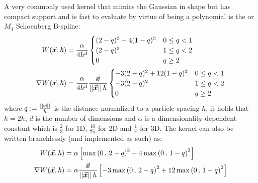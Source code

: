 A very commonly used kernel that mimics the Gaussian in shape but has compact support and
is fast to evaluate by virtue of being a polynomial is the  or $M_4$ Schoenberg B-spline\autocite*{price-2012}\autocite*{teschner-lecture}:
\begin{align}
  \label{eq:kernel-function}
  W(\vec{\bm{x}}, \hbar)        & = \frac{\alpha}{4h^d}\begin{cases}
                                                    (2-q)^3 -4(1-q)^3 & 0\leq q<1 \\
                                                    (2-q)^3           & 1\leq q<2 \\
                                                    0                 & q \geq 2
                                                  \end{cases}                                   \\\label{eq:kernel-function-nabla}
  \nabla W(\vec{\bm{x}}, \hbar) & = \frac{\alpha}{4h^d} \frac{\vec{\bm{x}}}{\left|\left|\vec{\bm{x}}\right|\right|h}\begin{cases}
                                                                                    -3(2-q)^2+12(1-q)^2 & 0\leq q<1 \\
                                                                                    -3(2-q)^2           & 1\leq q<2 \\
                                                                                    0                   & q \geq 2
                                                                                  \end{cases}
\end{align}
where $q:=\frac{\left|\left|\vec{\bm{x}}\right|\right|}{h}$ is the distance normalized to a particle spacing $h$, it holds that $\hbar=2h$, $d$ is the number of dimensions and $\alpha$ is a dimensionality-dependent constant which is $\frac{2}{3}$ for 1D, $\frac{10}{7 \pi}$ for 2D and $\frac{1}{\pi}$ for 3D\autocite*{price-2012}. The kernel can also be written branchlessly (and implemented as such) as\autocite*{teschner-lecture}:
\begin{align}
  W(\vec{\bm{x}}, \hbar)        & = \alpha \left[\max\left(0\,,\, 2-q\right)^3 -4\max\left(0\,,\, 1-q\right)^3 \right]                                    \\
  \nabla W(\vec{\bm{x}}, \hbar) & = \alpha \frac{\vec{\bm{x}}}{\left|\left|\vec{\bm{x}}\right|\right|h} \left[-3\max\left(0\,,\, 2-q\right)^2 +12\max\left(0\,,\, 1-q\right)^2 \right]
\end{align}

